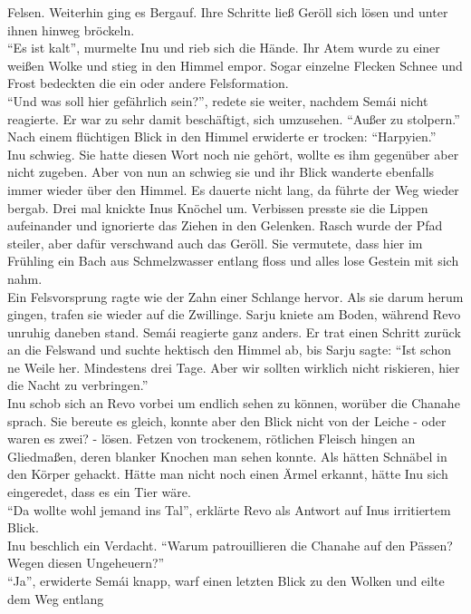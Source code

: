 Felsen. Weiterhin ging es Bergauf. Ihre Schritte ließ Geröll sich lösen und unter ihnen hinweg 
bröckeln.\\
``Es ist kalt'', murmelte Inu und rieb sich die Hände. Ihr Atem wurde zu einer weißen Wolke und 
stieg in den Himmel empor. Sogar einzelne Flecken Schnee und Frost bedeckten die ein oder andere 
Felsformation.\\
``Und was soll hier gefährlich sein?'', redete sie weiter, nachdem Semái nicht reagierte. Er war zu 
sehr damit beschäftigt, sich umzusehen. ``Außer zu stolpern.''\\
Nach einem flüchtigen Blick in den Himmel erwiderte er trocken: ``Harpyien.''\\
Inu schwieg. Sie hatte diesen Wort noch nie gehört, wollte es ihm gegenüber aber nicht zugeben. 
Aber von nun an schwieg sie und ihr Blick wanderte ebenfalls immer wieder über den Himmel. Es 
dauerte nicht lang, da führte der Weg wieder bergab. Drei mal knickte Inus Knöchel um. Verbissen 
presste sie die Lippen aufeinander und ignorierte das Ziehen in den Gelenken. Rasch wurde der Pfad 
steiler, aber dafür verschwand auch das Geröll. Sie vermutete, dass hier im Frühling ein Bach aus 
Schmelzwasser entlang floss und alles lose Gestein mit sich nahm.\\
Ein Felsvorsprung ragte wie der Zahn einer Schlange hervor. Als sie darum herum gingen, trafen sie 
wieder auf die Zwillinge. Sarju kniete am Boden, während Revo unruhig daneben stand. Semái 
reagierte ganz anders. Er trat einen Schritt zurück an die Felswand und suchte hektisch den Himmel 
ab, bis Sarju sagte: ``Ist schon ne Weile her. Mindestens drei Tage. Aber wir sollten wirklich 
nicht riskieren, hier die Nacht zu verbringen.''\\
Inu schob sich an Revo vorbei um endlich sehen zu können, worüber die Chanahe sprach. Sie bereute 
es gleich, konnte aber den Blick nicht von der Leiche - oder waren es zwei? - lösen. Fetzen von 
trockenem, rötlichen Fleisch hingen an Gliedmaßen, deren blanker Knochen man sehen konnte. Als 
hätten Schnäbel in den Körper gehackt. Hätte man nicht noch einen Ärmel erkannt, hätte 
Inu sich eingeredet, dass es ein Tier wäre.\\
``Da wollte wohl jemand ins Tal'', erklärte Revo als Antwort auf Inus irritiertem Blick.\\
Inu beschlich ein Verdacht. ``Warum patrouillieren die Chanahe auf den Pässen? Wegen diesen 
Ungeheuern?''\\
``Ja'', erwiderte Semái knapp, warf einen letzten Blick zu den Wolken und eilte dem Weg entlang 
